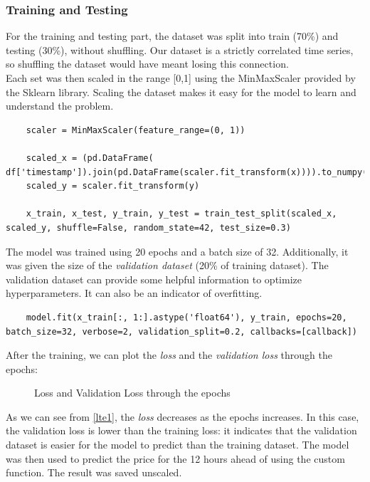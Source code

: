 \subsubsection{Training and Testing}
For the training and testing part, the dataset was split into train (70\%) and testing (30\%), without shuffling. Our dataset is a strictly correlated time series, so shuffling the dataset would have meant losing this connection. \\ 
Each set was then scaled in the range [0,1] using the MinMaxScaler provided by the Sklearn library. Scaling the dataset makes it easy for the model to learn and understand the problem.
\begin{verbatim}
    scaler = MinMaxScaler(feature_range=(0, 1))
    
    scaled_x = (pd.DataFrame( df['timestamp']).join(pd.DataFrame(scaler.fit_transform(x)))).to_numpy()
    scaled_y = scaler.fit_transform(y)
    
    x_train, x_test, y_train, y_test = train_test_split(scaled_x, scaled_y, shuffle=False, random_state=42, test_size=0.3)
\end{verbatim}

The model was trained using 20 epochs and a batch size of 32. Additionally, it was given the size of the \textit{validation dataset} (20\% of training dataset). The validation dataset can provide some helpful information to optimize hyperparameters. It can also be an indicator of overfitting.

\begin{verbatim}
    model.fit(x_train[:, 1:].astype('float64'), y_train, epochs=20, batch_size=32, verbose=2, validation_split=0.2, callbacks=[callback])
\end{verbatim}

After the training, we can plot the \textit{loss} and the \textit{validation loss} through the epochs:

\begin{figure}[H]
    \centering
    
    \caption{Loss and Validation Loss through the epochs}
    \label{lte1}
\end{figure}

As we can see from \autoref{lte1}, the \textit{loss} decreases as the epochs increases. In this case, the validation loss is lower than the training loss: it indicates that the validation dataset is easier for the model to predict than the training dataset. The model was then used to predict the price for the 12 hours ahead of using the custom function. The result was saved unscaled.
